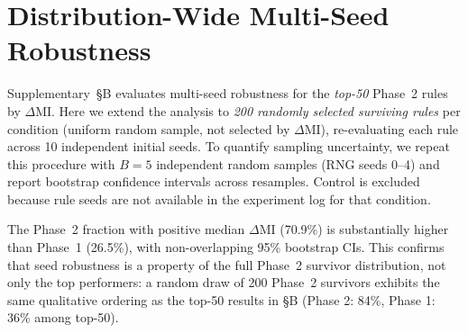\documentclass[letterpaper]{article}
\begin{document}
\section{Distribution-Wide Multi-Seed Robustness}
\label{app:random_multi_seed}

Supplementary~\S{}B evaluates multi-seed robustness for the \emph{top-50}
Phase~2 rules by $\Delta\mathrm{MI}$.  Here we extend the analysis to
\emph{200 randomly selected surviving rules} per condition (uniform random
sample, not selected by $\Delta\mathrm{MI}$), re-evaluating each rule
across 10 independent initial seeds.  To quantify sampling uncertainty,
we repeat this procedure with $B=5$ independent random samples (RNG
seeds 0--4) and report bootstrap confidence intervals across resamples.
Control is excluded because rule seeds are not available in the
experiment log for that condition.

\begin{table}[htbp]
\centering
\caption{Distribution-wide multi-seed robustness ($B=5$ resamples of 200
random survivors, 10 seeds per rule). Fraction positive median: fraction
of rules whose median $\Delta\mathrm{MI}>0$ across seeds.
Mean $P(\Delta\mathrm{MI}>0)$: mean fraction of seeds with $\Delta\mathrm{MI}>0$.
95\% CI is the percentile interval across $B=5$ resamples.}
\label{tab:random_multi_seed}
\end{table}

The Phase~2 fraction with positive median $\Delta\mathrm{MI}$ (70.9\%) is
substantially higher than Phase~1 (26.5\%), with non-overlapping 95\%
bootstrap CIs.  This confirms that seed robustness is a property of the
full Phase~2 survivor distribution, not only the top performers: a random
draw of 200 Phase~2 survivors exhibits the same qualitative ordering as
the top-50 results in \S{}B (Phase 2: 84\%, Phase 1: 36\% among top-50).
\end{document}
